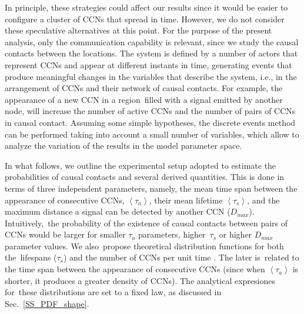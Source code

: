 \documentclass[crop]{CSLB}
\newcommand{\ceti}{CCN}
\newcommand{\cetis}{CCNs}
\begin{document}
%
In principle, these strategies could affect our results since it would be easier to configure a cluster of \cetis{} that spread in time.
%
However, we do not consider these speculative alternatives at this point.
%
For the purpose of the present analysis, only the communication capability is relevant, since we study the causal contacts between the locations.
%
The system is defined by a number of actors that represent \cetis{} and appear at different instants in time, generating events that produce meaningful changes in the variables that describe the system, i.e., in the arrangement of \cetis{} and their network of causal contacts.
%
For example, the appearance of a new \ceti{} in a region filled with a signal emitted by another node, will increase the number of active \cetis{} and the number of pairs of \cetis{} in causal contact.
%
Assuming some simple hypotheses, the discrete events method can be performed taking into account a small number of variables, which allow to analyze the variation of the results in the model parameter space.



In what follows, we outline the experimental setup adopted to estimate the probabilities of causal contacts and several derived quantities.
%
This is done in terms of three independent parameters, namely, the mean time span between the appearance of consecutive \cetis{}, $\left<\tau_a\right>$, their mean lifetime $\left<\tau_s\right>$, and the maximum distance a signal can be detected by another \ceti{} ($D_{max}$).
%
Intuitively, the probability of the existence of causal contacts between pairs of \cetis{} would be larger for smaller $\tau_a$ parameters, higher $\tau_s$ or higher $D_{max}$ parameter values.
%
We also propose theoretical distribution functions for both the lifespans ($\tau_s$) and the number of \cetis{} per unit time \citep{maccone_evolution_2014, Sotos_biotechnology_2019}.
%
The later is related to the time span between the appearance of consecutive \cetis{} (since when $\left<\tau_a\right>$ is shorter, it produces a greater density of \cetis{}).
%
The analytical expresiones for these distributions are set to a fixed law, as discussed in Sec.~\ref{SS_PDF_shape}.  
    
\end{document}
